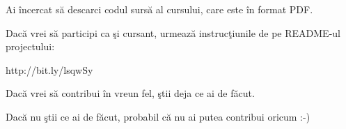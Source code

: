Ai încercat să descarci codul sursă al cursului, care este în format PDF.

Dacă vrei să participi ca şi cursant, urmează instrucţiunile de pe README-ul projectului:

http://bit.ly/lsqwSy

Dacă vrei să contribui în vreun fel, ştii deja ce ai de făcut.

Dacă nu ştii ce ai de făcut, probabil că nu ai putea contribui oricum :-)
